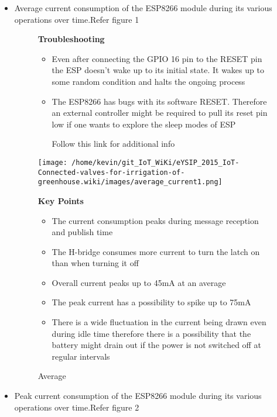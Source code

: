 \documentclass[16pt]{article}
\begin{document}
\begin{itemize}

\item
  Average current consumption of the ESP8266 module during its various
  operations over time.Refer figure 1 


\begin{figure}

\textbf{Troubleshooting}

\vspace{0.2cm}
\begin{itemize}
\item
  Even after connecting the GPIO 16 pin to the RESET pin the ESP doesn't
  wake up to its initial state. It wakes up to some random condition and
  halts the ongoing process
\item
  The ESP8266 has bugs with its software RESET. Therefore an external
  controller might be required to pull its reset pin low if one wants to
  explore the sleep modes of ESP
  
  Follow this link for additional info
\end{itemize}
\texttt{[image: /home/kevin/git\_IoT\_WiKi/eYSIP\_2015\_IoT-Connected-valves-for-irrigation-of-greenhouse.wiki/images/average\_current1.png]}
\caption{Average}
\textbf{Key Points}

  \begin{itemize}

  \item
    The current consumption peaks during message reception and publish
    time
  \item
    The H-bridge consumes more current to turn the latch on than when
    turning it off
  \item
    Overall current peaks up to 45mA at an average
  \item
    The peak current has a possibility to spike up to 75mA
  \item
    There is a wide fluctuation in the current being drawn even during
    idle time therefore there is a possibility that the battery might
    drain out if the power is not switched off at regular intervals
  \end{itemize}
\end{figure}


\item
  Peak current consumption of the ESP8266 module during its various
  operations over time.Refer figure 2 


\end{itemize}
\end{document}
